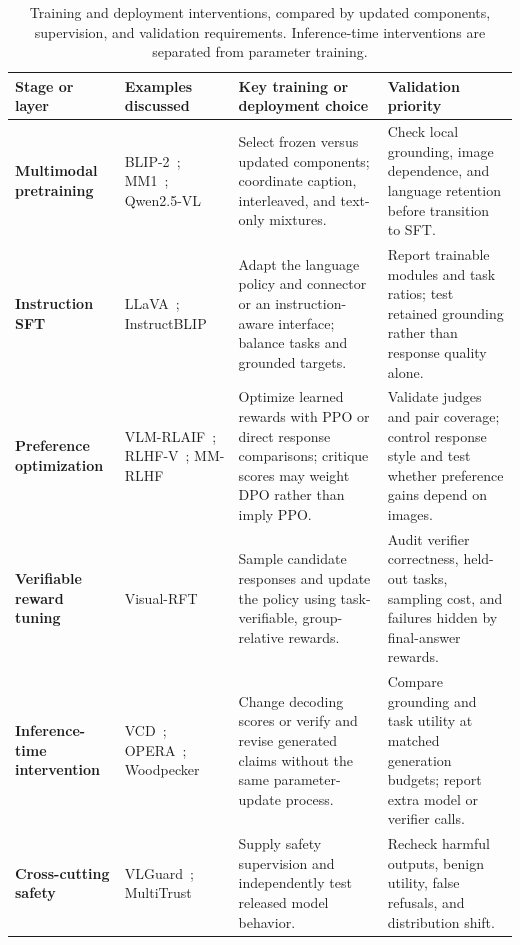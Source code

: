 \begin{table}[t]
\centering
\caption{Training and deployment interventions, compared by updated components, supervision, and validation requirements. Inference-time interventions are separated from parameter training.}
\label{tab:lifecycle-taxonomy}
\footnotesize
\setlength{\tabcolsep}{4pt}
\renewcommand{\arraystretch}{1.18}
\begin{tabularx}{\textwidth}{>{\raggedright\arraybackslash}p{}>{\raggedright\arraybackslash}p{}>{\raggedright\arraybackslash}X>{\raggedright\arraybackslash}X}
\toprule
\rowcolor{surveyheader}
\textbf{Stage or layer} & \textbf{Examples discussed} & \textbf{Key training or deployment choice} & \textbf{Validation priority} \\
\midrule
\textbf{Multimodal pretraining} & BLIP-2~\cite{li2023blip2}; MM1~\cite{mckinzie2024mm1}; Qwen2.5-VL~\cite{bai2025qwen25vl} & Select frozen versus updated components; coordinate caption, interleaved, and text-only mixtures. & Check local grounding, image dependence, and language retention before transition to SFT. \\
\textbf{Instruction SFT} & LLaVA~\cite{liu2023llava}; InstructBLIP~\cite{dai2023instructblip} & Adapt the language policy and connector or an instruction-aware interface; balance tasks and grounded targets. & Report trainable modules and task ratios; test retained grounding rather than response quality alone. \\
\textbf{Preference optimization} & VLM-RLAIF~\cite{ahn2024rlaif_v}; RLHF-V~\cite{yu2024rlhf}; MM-RLHF~\cite{pmlr-v267-zhang25cs} & Optimize learned rewards with PPO or direct response comparisons; critique scores may weight DPO rather than imply PPO. & Validate judges and pair coverage; control response style and test whether preference gains depend on images. \\
\textbf{Verifiable reward tuning} & Visual-RFT~\cite{liu2025visualrft} & Sample candidate responses and update the policy using task-verifiable, group-relative rewards. & Audit verifier correctness, held-out tasks, sampling cost, and failures hidden by final-answer rewards. \\
\textbf{Inference-time intervention} & VCD~\cite{leng2024vcd}; OPERA~\cite{huang2024opera}; Woodpecker~\cite{yin2024woodpecker} & Change decoding scores or verify and revise generated claims without the same parameter-update process. & Compare grounding and task utility at matched generation budgets; report extra model or verifier calls. \\
\textbf{Cross-cutting safety} & VLGuard~\cite{zong2024vlguard}; MultiTrust~\cite{zhang2024multitrust} & Supply safety supervision and independently test released model behavior. & Recheck harmful outputs, benign utility, false refusals, and distribution shift. \\
\bottomrule
\end{tabularx}
\end{table}
